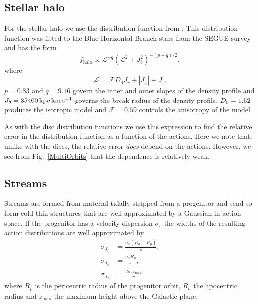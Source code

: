 \documentclass[useAMS,usenatbib,fleqn,a4paper]{mn2e}
\def\kpc{\,{\rm kpc}}
\def\kms{\,{\rm km\,s^{-1}}}
\begin{document}
\subsection{Stellar halo}

For the stellar halo we use the distribution function from
\cite{Williams2015}. This distribution function was fitted to the Blue
Horizontal Branch stars from the SEGUE survey and has the form
\begin{equation}
f_\mathrm{halo}\propto \mathcal{L}^{-q}(\mathcal{L}^2+J_b^2)^{-(p-q)/2},
\end{equation}
where
\begin{equation}
\mathcal{L} = \mathcal{F}D_0 J_r+|J_\phi|+J_z.
\end{equation}
$p=0.83$ and $q=9.16$ govern the inner and outer slopes of the density
profile and $J_b=35400\kpc\kms$ governs the break radius of the density
profile. $D_0=1.52$ produces the isotropic model and $\mathcal{F}=0.59$
controls the anisotropy of the model.

As with the disc distribution functions we use this expression to find the
relative error in the distribution function as a function of the actions.
Here we note that, unlike with the discs, the relative error \emph{does}
depend on the actions. However, we see from Fig.~\ref{MultiOrbits} that the
dependence is relatively weak.

\subsection{Streams}

Streams are formed from material tidally stripped from a progenitor and tend
to form cold thin structures that are well approximated by a Gaussian in
action space. If the progenitor has a velocity dispersion $\sigma_v$ the
widths of the resulting action distributions are well approximated by
\citep{EyreBinney2011}
\begin{equation}
\begin{split}
\sigma_{J_r} &= \frac{\sigma_v(R_a-R_p)}{\pi},\\
\sigma_{J_\phi} &= \frac{\sigma_v R_p}{\pi},\\
\sigma_{J_z} &= \frac{2\sigma_v z_\mathrm{max}}{\pi}
\end{split}
\label{ActionSpread}
\end{equation}
where $R_p$ is the pericentric radius of the progenitor orbit, $R_a$ the
apocentric radius and $z_\mathrm{max}$ the maximum height above the Galactic
plane.
\end{document}
